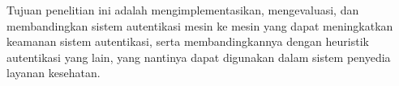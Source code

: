 Tujuan penelitian ini adalah mengimplementasikan, mengevaluasi, dan membandingkan sistem autentikasi mesin ke mesin yang dapat meningkatkan keamanan sistem autentikasi, serta membandingkannya dengan heuristik autentikasi yang lain, yang nantinya dapat digunakan dalam sistem penyedia layanan kesehatan.